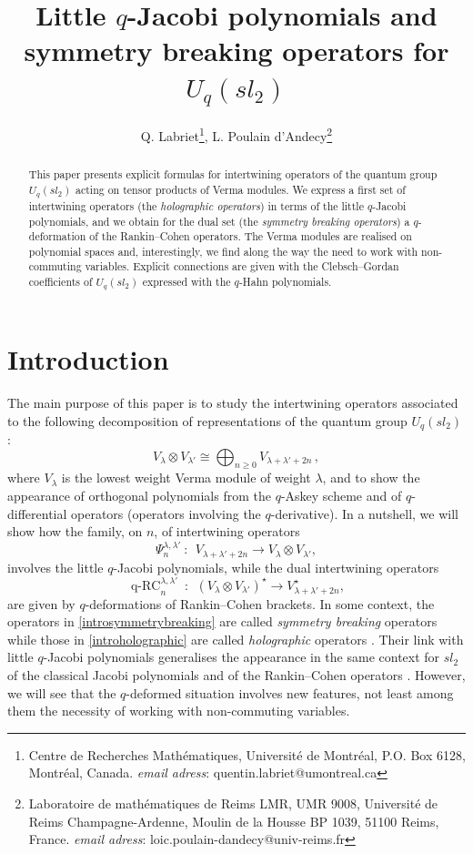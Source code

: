 \documentclass[a4paper,12pt]{article}
\title{Little $q$-Jacobi polynomials and symmetry breaking operators for $U_q(sl_2)$}
\author{Q. Labriet\footnote{ Centre de Recherches Math\'ematiques, Universit\'e de Montr\'eal, P.O. Box 6128, Montréal, Canada. \emph{email adress}: quentin.labriet@umontreal.ca}, L. Poulain d'Andecy\footnote{Laboratoire de math\'ematiques de Reims LMR, UMR 9008, Universit\'e de Reims Champagne-Ardenne, Moulin de la Housse BP 1039, 51100 Reims, France. \emph{email adress}: loic.poulain-dandecy@univ-reims.fr}}
\date{}
\numberwithin{equation}{section}
\theoremstyle{rem}
\theoremstyle{definition}
\begin{document}
\maketitle



\begin{abstract}
This paper presents explicit formulas for intertwining operators of the quantum group $U_q(sl_2)$ acting on tensor products of Verma modules. We express a first set of intertwining operators (the \emph{holographic operators}) in terms of the little $q$-Jacobi polynomials, and we obtain for the dual set (the \emph{symmetry breaking operators}) a $q$-deformation of the Rankin--Cohen operators. The Verma modules are realised on polynomial spaces and, interestingly, we find along the way the need to work with non-commuting variables. Explicit connections are given with the Clebsch--Gordan coefficients of $U_q(sl_2)$ expressed with the $q$-Hahn polynomials.
\end{abstract}
\section{Introduction}

The main purpose of this paper is to study the intertwining operators associated to the following decomposition of representations of the quantum group $U_q(sl_2)$:
\[V_{\lambda}\otimes V_{\lambda'}\cong \bigoplus_{n\geq 0} V_{\lambda+\lambda'+2n}\,,\]
where $V_{\lambda}$ is the lowest weight Verma module of weight $\lambda$, and to show the appearance of orthogonal polynomials from the $q$-Askey scheme and of $q$-differential operators (operators involving the $q$-derivative). In a nutshell, we will show how the family, on $n$, of intertwining operators 
\begin{equation}\label{introholographic}\Psi^{\lambda,\lambda'}_n\ :\ \ V_{\lambda+\lambda'+2n}\to V_{\lambda}\otimes V_{\lambda'},
\end{equation}
involves the little $q$-Jacobi polynomials, while the dual intertwining operators
\begin{equation}\label{introsymmetrybreaking}\operatorname{q-RC}^{\lambda,\lambda'}_n\ :\ \ (V_{\lambda}\otimes V_{\lambda'})^{\star} \to V_{\lambda+\lambda'+2n}^{\star}, \end{equation}
are given by $q$-deformations of Rankin--Cohen brackets. In some context, the operators in \eqref{introsymmetrybreaking} are called \emph{symmetry breaking} operators while those in \eqref{introholographic} are called \emph{holographic} operators \cite{KobaPevznerIII}. Their link with little $q$-Jacobi polynomials generalises the appearance in the same context for $sl_2$ of the classical Jacobi polynomials and of the Rankin--Cohen operators \cite{LabrietPoulain23,LabrietPoulain24}. However, we will see that the $q$-deformed situation involves new features, not least among them the necessity of working with non-commuting variables.
\end{document}
